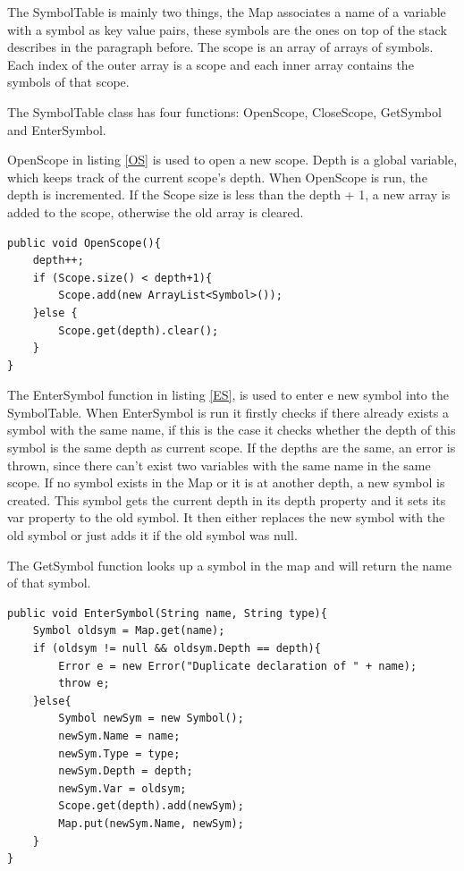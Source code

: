 The SymbolTable is mainly two things, the Map associates a name of a variable with a symbol as key value pairs, these symbols are the ones on top of the stack describes in the paragraph before. The scope is an array of arrays of symbols. Each index of the outer array is a scope and each inner array contains the symbols of that scope. 

The SymbolTable class has four functions: OpenScope, CloseScope, GetSymbol and EnterSymbol. 

OpenScope in listing \ref{OS} is used to open a new scope. Depth is a global variable, which keeps track of the current scope's depth. When OpenScope is run, the depth is incremented. If the Scope size is less than the depth + 1, a new array is added to the scope, otherwise the old array is cleared.

\begin{lstlisting}[caption={OpenScope function}, label={OS}]
public void OpenScope(){
    depth++;
    if (Scope.size() < depth+1){
        Scope.add(new ArrayList<Symbol>());
    }else {
        Scope.get(depth).clear();
    }
}
\end{lstlisting}

 The EnterSymbol function in listing \ref{ES}, is used to enter e new symbol into the SymbolTable. When EnterSymbol is run it firstly checks if there already exists a symbol with the same name, if this is the case it checks whether the depth of this symbol is the same depth as current scope. If the depths are the same, an error is thrown, since there can't exist two variables with the same name in the same scope. If no symbol exists in the Map or it is at another depth, a new symbol is created. This symbol gets the current depth in its depth property and it sets its var property to the old symbol. It then either replaces the new symbol with the old symbol or just adds it if the old symbol was null. 

The GetSymbol function looks up a symbol in the map and will return the name of that symbol.

\begin{lstlisting}[caption={EnterSymbol function}, label={ES}]
public void EnterSymbol(String name, String type){
    Symbol oldsym = Map.get(name);
    if (oldsym != null && oldsym.Depth == depth){
        Error e = new Error("Duplicate declaration of " + name);
        throw e;
    }else{
        Symbol newSym = new Symbol();
        newSym.Name = name;
        newSym.Type = type;
        newSym.Depth = depth;
        newSym.Var = oldsym;
        Scope.get(depth).add(newSym);
        Map.put(newSym.Name, newSym);
    }
}
\end{lstlisting}

